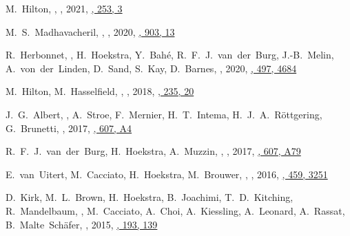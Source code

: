 
\item
M.~Hilton, \myself, 
,
2021, \href{https://ui.adsabs.harvard.edu/abs/2020arXiv200911043H/abstract}{\apjs, 253, 3}

\item
M.~S.~Madhavacheril, \myself, 
,
2020, \href{https://ui.adsabs.harvard.edu/abs/2020arXiv200907772M/abstract}{\apjl, 903, 13}

\item
R.~Herbonnet, \myself, H.~Hoekstra, Y.~Bah\'e, R.~F.~J.~van~der~Burg, 
J.-B.~Melin, A.~von~der~Linden, D.~Sand, S.~Kay, D.~Barnes,
,
2020, \href{https://ui.adsabs.harvard.edu/abs/2020MNRAS.497.4684H/abstract}{\mnras, 497, 4684}

\item
M.~Hilton, M.~Hasselfield, \myself, 
,
2018, \href{https://ui.adsabs.harvard.edu/abs/2018ApJS..235...20H}{\apjs, 235, 20}

\item
J.~G.~Albert, \myself, A.~Stroe, F.~Mernier, H.~T.~Intema, H.~J.~A.~R\"ottgering, 
G.~Brunetti,
,
2017, \href{https://ui.adsabs.harvard.edu/abs/2017A&A...607A...4A}{\aap, 607, A4}

\item
R.~F.~J.~van~der~Burg, H.~Hoekstra, A.~Muzzin, \myself, 
,
2017, \href{https://ui.adsabs.harvard.edu/abs/2017A&A...607A..79V}{\aap, 607, A79}

\item
E.~van~Uitert, M.~Cacciato, H.~Hoekstra, M.~Brouwer, \myself, 
,
2016, \href{https://ui.adsabs.harvard.edu/abs/2016MNRAS.459.3251V}{\mnras, 459, 3251}

\item
D.~Kirk, M.~L.~Brown, H.~Hoekstra, B.~Joachimi, T.~D.~Kitching, R.~Mandelbaum, 
\myself, M.~Cacciato, A.~Choi, A.~Kiessling, A.~Leonard, A.~Rassat, 
B.~Malte~Sch\"afer,
,
2015, \href{https://ui.adsabs.harvard.edu/abs/2015SSRv..193..139K/abstract}{\ssr, 193, 139}


